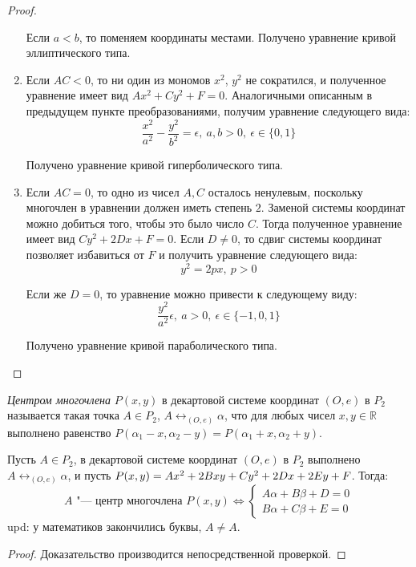 \begin{proof}
\begin{enumerate}
    		Если $a < b$, то поменяем координаты местами. Получено уравнение кривой эллиптического типа.
    		
    		\item Если $AC < 0$, то ни один из мономов $x^2$, $y^2$ не сократился, и полученное уравнение имеет вид $Ax^2 + Cy^2 + F = 0$. Аналогичными описанным в предыдущем пункте преобразованиями, получим уравнение следующего вида:
    		\[\frac{x^2}{a^2} - \frac{y^2}{b^2} = \epsilon,~a, b > 0,~\epsilon \in \{0, 1\}\]
    		
    		Получено уравнение кривой гиперболического типа.
    		
    		\item Если $AC = 0$, то одно из чисел $A, C$ осталось ненулевым, поскольку многочлен в уравнении должен иметь степень $2$. Заменой системы координат можно добиться того, чтобы это было число $C$. Тогда полученное уравнение имеет вид $Cy^2+2Dx+F = 0$. Если $D \ne 0$, то сдвиг системы координат позволяет избавиться от $F$ и получить уравнение следующего вида:
    		\[y^2 = 2px,~p>0\]
    		
    		Если же $D = 0$, то уравнение можно привести к следующему виду:
    		\[\frac{y^2}{a^2} \epsilon,~a > 0,~\epsilon \in \{-1, 0, 1\}\]
    		
    		Получено уравнение кривой параболического типа.\qedhere
    	\end{enumerate}
    \end{proof}
    
    \begin{definition}
    	\textit{Центром многочлена} $P(x, y)$ в декартовой системе координат $(O, e)$ в $P_2$ называется такая точка $A \in P_2$, $A \leftrightarrow_{(O, e)} \alpha$, что для любых чисел $x, y \in \mathbb{R}$ выполнено равенство $P(\alpha_1 - x, \alpha_2 - y) = P(\alpha_1 + x, \alpha_2 + y)$.
    \end{definition}
    
    \begin{proposition}
    	Пусть $A \in P_2$, в декартовой системе координат $(O, e)$ в $P_2$ выполнено $A \leftrightarrow_{(O, e)} \alpha$, и пусть $P(x, y) \hm{=} Ax^2 + 2Bxy + Cy^2 + 2Dx + 2Ey + F$. Тогда:
    	\[A \text{ "--- центр многочлена } P(x, y) \Leftrightarrow \left\{\begin{aligned}
    	A\alpha + B\beta + D = 0\\
    	B\alpha + C\beta + E = 0
    	\end{aligned}\right.\]
        upd: у математиков закончились буквы, $A \neq A$.
    \end{proposition}
    
    \begin{proof}
    	Доказательство производится непосредственной проверкой.
    \end{proof}
